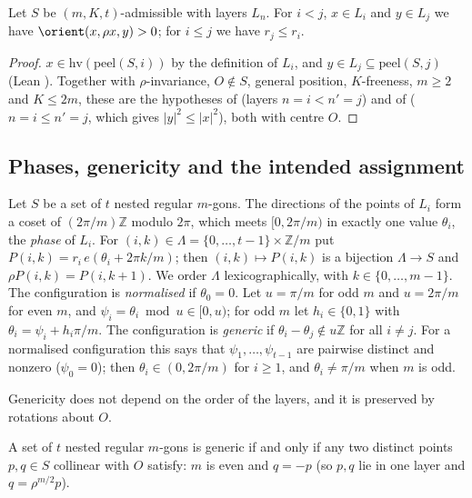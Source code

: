 \begin{lemma}\label{k8s:lem:nest}
Let $S$ be $(m,K,t)$-admissible with layers $L_n$. For $i<j$, $x\in L_i$ and $y\in L_j$ we have $\orient(x,\rho x,y)>0$;
for $i\le j$ we have $r_j\le r_i$.
\end{lemma}

\begin{proof}
$x\in\mathrm{hv}(\mathrm{peel}(S,i))$ by the definition of $L_i$, and $y\in L_j\subseteq\mathrm{peel}(S,j)$ (Lean
). Together with $\rho$-invariance, $O\notin S$, general position, $K$-freeness, $m\ge2$ and
$K\le2m$, these are the hypotheses of  (layers $n=i<n'=j$) and of 
($n=i\le n'=j$, which gives $|y|^2\le|x|^2$), both with centre $O$.
\end{proof}

\subsection{Phases, genericity and the intended assignment}\label{k8s:sec:phases}

\begin{definition}\label{k8s:def:phase}
Let $S$ be a set of $t$ nested regular $m$-gons. The directions of the points of $L_i$ form a coset of
$(2\pi/m)\mathbb Z$ modulo $2\pi$, which meets $[0,2\pi/m)$ in exactly one value $\theta_i$, the \emph{phase} of $L_i$.
For $(i,k)\in\Lambda=\{0,\dots,t-1\}\times\mathbb Z/m$ put $P(i,k)=r_i\,e(\theta_i+2\pi k/m)$; then $(i,k)\mapsto P(i,k)$
is a bijection $\Lambda\to S$ and $\rho P(i,k)=P(i,k+1)$. We order $\Lambda$ lexicographically, with
$k\in\{0,\dots,m-1\}$. The configuration is \emph{normalised} if $\theta_0=0$. Let $u=\pi/m$ for odd $m$ and $u=2\pi/m$
for even $m$, and $\psi_i=\theta_i\bmod u\in[0,u)$; for odd $m$ let $h_i\in\{0,1\}$ with $\theta_i=\psi_i+h_i\pi/m$. The
configuration is \emph{generic} if $\theta_i-\theta_j\notin u\mathbb Z$ for all $i\ne j$. For a normalised configuration
this says that $\psi_1,\dots,\psi_{t-1}$ are pairwise distinct and nonzero ($\psi_0=0$); then $\theta_i\in(0,2\pi/m)$ for
$i\ge1$, and $\theta_i\ne\pi/m$ when $m$ is odd.
\end{definition}

Genericity does not depend on the order of the layers, and it is preserved by rotations about $O$.

\begin{lemma}\label{k8s:lem:collinear}
A set of $t$ nested regular $m$-gons is generic if and only if any two distinct points $p,q\in S$ collinear with $O$
satisfy: $m$ is even and $q=-p$ (so $p,q$ lie in one layer and $q=\rho^{m/2}p$).
\end{lemma}

